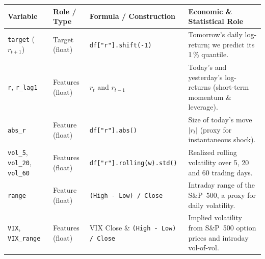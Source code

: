 \documentclass[10pt,a4paper]{article}
\newcommand{\code}[1]{\texttt{\small #1}}
\begin{document}
\begin{center}
\small
{}
\begin{tabularx}{\linewidth}{@{}>{\raggedright}p{2.9cm} >{\raggedright}p{2.1cm} >{\raggedright}p{4.0cm} X@{}}
\toprule
\textbf{Variable} & \textbf{Role / Type} & \textbf{Formula / Construction} & \textbf{Economic \& Statistical Role} \\
\midrule
\code{target} ($r_{t+1}$) & Target (float) & \code{df["r"].shift(-1)} & Tomorrow's daily log-return; we predict its 1\,\% quantile. \\
\code{r}, \code{r\_lag1} & Features (float) & $r_t$ and $r_{t-1}$ & Today's and yesterday's log-returns (short-term momentum \& leverage). \\
\code{abs\_r} & Feature (float) & \code{df["r"].abs()} & Size of today's move $|r_t|$ (proxy for instantaneous shock). \\
\code{vol\_5}, \code{vol\_20}, \code{vol\_60} & Features (float) & \code{df["r"].rolling(w).std()} & Realized rolling volatility over 5, 20 and 60 trading days. \\
\code{range} & Feature (float) & \code{(High - Low) / Close} & Intraday range of the S\&P~500, a proxy for daily volatility. \\
\code{VIX}, \code{VIX\_range} & Features (float) & VIX Close \& \code{(High - Low) / Close} & Implied volatility from S\&P~500 option prices and intraday vol-of-vol. \\
\bottomrule
\end{tabularx}
\end{center}
\end{document}
